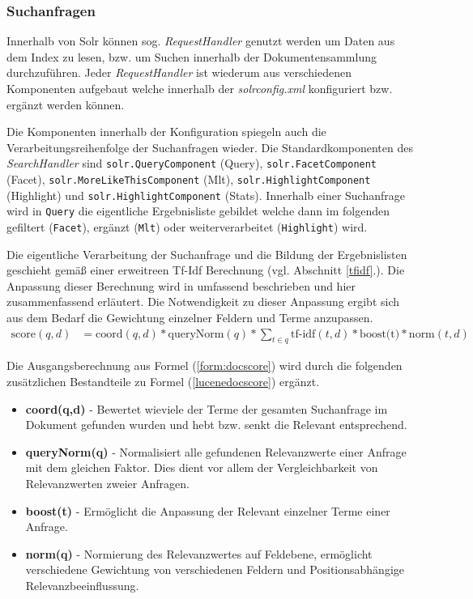 \subsubsection{Suchanfragen}

Innerhalb von Solr können sog. \textit{RequestHandler} genutzt werden um Daten aus dem Index zu lesen, bzw. um Suchen innerhalb der Dokumentensammlung durchzuführen. Jeder \textit{RequestHandler} ist wiederum aus verschiedenen Komponenten aufgebaut welche innerhalb der \textit{solrconfig.xml} konfiguriert bzw. ergänzt werden können. 

Die Komponenten innerhalb der Konfiguration spiegeln auch die Verarbeitungsreihenfolge der Suchanfragen wieder. Die Standardkomponenten des \textit{SearchHandler} sind \texttt{solr.QueryComponent} (Query), \texttt{solr.FacetComponent} (Facet), \texttt{solr.MoreLikeThisComponent} (Mlt), \texttt{solr.HighlightComponent} (Highlight) und \texttt{solr.HighlightComponent} (Stats). Innerhalb einer Suchanfrage wird in \texttt{Query} die eigentliche Ergebnisliste gebildet welche dann im folgenden gefiltert (\texttt{Facet}), ergänzt (\texttt{Mlt}) oder weiterverarbeitet (\texttt{Highlight}) wird.

Die eigentliche Verarbeitung der Suchanfrage und die Bildung der Ergebnislisten geschieht gemäß einer erweitreen Tf-Idf Berechnung (vgl. Abschnitt \ref{tfidf}.). Die Anpassung dieser Berechnung wird in \citep{TFIDFSimilarity} umfassend beschrieben und hier zusammenfassend erläutert. Die Notwendigkeit zu dieser Anpassung ergibt sich aus dem Bedarf die Gewichtung einzelner Feldern und Terme anzupassen.
\begin{align}
\text{score}(q, d) & = \text{coord}(q,d) \ast \text{queryNorm}(q) \ast \sum_{t \in q}{\text{tf-idf}(t, d) \ast \text{boost(t)} \ast \text{norm}(t,d)} \label{lucenedocscore}
\end{align}

Die Ausgangsberechnung aus Formel (\ref{form:docscore}) wird durch die folgenden zusätzlichen Bestandteile zu Formel (\ref{lucenedocscore}) ergänzt.

\begin{itemize}
\item \textbf{coord(q,d)} - Bewertet wieviele der Terme der gesamten Suchanfrage im Dokument gefunden wurden und hebt bzw. senkt die Relevant entsprechend.
\item \textbf{queryNorm(q)} - Normalisiert alle gefundenen Relevanzwerte einer Anfrage mit dem gleichen Faktor. Dies dient vor allem der Vergleichbarkeit von Relevanzwerten zweier Anfragen.
\item \textbf{boost(t)} - Ermöglicht die Anpassung der Relevant einzelner Terme einer Anfrage.
\item \textbf{norm(q)} - Normierung des Relevanzwertes auf Feldebene, ermöglicht verschiedene Gewichtung von verschiedenen Feldern und Positionsabhängige Relevanzbeeinflussung.
\end{itemize}

